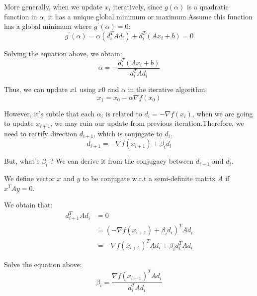 \documentclass[titlepage,a4paper,12pt]{article}
\begin{document}
More generally, when we update $x_i$ iteratively, since $g(\alpha)$ is a quadratic function in $\alpha$, it has a unique global minimum or maximum.Assume this function has a global minimum where $g^{\prime}(\alpha) = 0$:
\begin{equation}
	g^{\prime}(\alpha) = \alpha (d_i^{T} A d_i) + d_i^{T} (A x_i + b) = 0
\end{equation}

Solving the equation above, we obtain:
\begin{equation}
	\alpha = - \frac{d_i^{T} (A x_i + b)}{d_i^{T} A d_i}
\end{equation}

Thus, we can update $x1$ using $x0$ and $\alpha$ in the iterative algorithm:
\begin{equation}
	x_{1} = x_0 - \alpha \nabla f(x_0)
\end{equation}

However, it's subtle that each $\alpha_i$ is related to $d_i = -\nabla f(x_i)$, when we are going to update $x_{i + 1}$, we may ruin our update from previous iteration.Therefore, we need to rectify direction $d_{i + 1}$, which is conjugate to $d_i$.
\begin{equation}
	d_{i + 1} = - \nabla f(x_{i + 1}) + \beta_i d_i
\end{equation}

But, what's $\beta_i$ ? We can derive it from the conjugacy between $d_{i + 1}$ and $d_i$.

We define vector $x$ and $y$ to be conjugate w.r.t a semi-definite matrix $A$ if $x^{T} A y = 0$.

We obtain that: 
\begin{equation}
\begin{aligned}
	d_{i + 1}^{T} A d_i &= 0 \\
						&= \left( - \nabla f(x_{i + 1}) + \beta_i d_i \right)^{T} A d_i \\
						&= -\nabla f(x_{i + 1})^{T} A d_i + \beta_i d_i^{T} A d_i
\end{aligned}
\end{equation}

Solve the equation above:
\begin{equation}
	\beta_i = \frac{\nabla f(x_{i + 1})^{T} A d_i}{d_i^{T} A d_i}
\end{equation}
\end{document}
